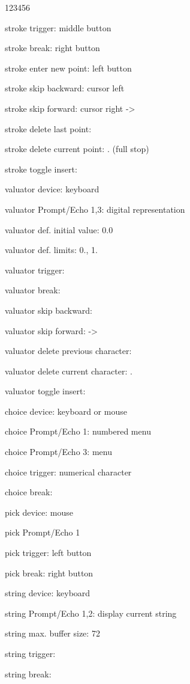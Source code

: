 \begin{DLtt}{123456}
\item[stroke trigger:]middle button
\item[stroke break:]right button
\item[stroke enter new point:]left button
\item[stroke skip backward:]cursor left \Lit{<-}
\item[stroke skip forward:]cursor right ->
\item[stroke delete last point:]
\item[stroke delete current point:]. (full stop)
\item[stroke toggle insert:]
\item[valuator device:]keyboard
\item[valuator Prompt/Echo 1,3:]digital representation
\item[valuator def. initial value:]0.0
\item[valuator def. limits:]0., 1.
\item[valuator trigger:]
\item[valuator break:]
\item[valuator skip backward:]\Lit{<-}
\item[valuator skip forward:]->
\item[valuator delete previous character:]
\item[valuator delete current character:].
\item[valuator toggle insert:]
\item[choice device:]keyboard or mouse
\item[choice Prompt/Echo 1:]numbered menu
\item[choice Prompt/Echo 3:]menu
\item[choice trigger:]numerical character 
\item[choice break:]
\item[pick device:]mouse
\item[pick Prompt/Echo 1]
\item[pick trigger:]left button
\item[pick break:]right button
\item[string device:]keyboard
\item[string Prompt/Echo 1,2:]display current string
\item[string max. buffer size:]72
\item[string trigger:]
\item[string break:]

\end{DLtt}
